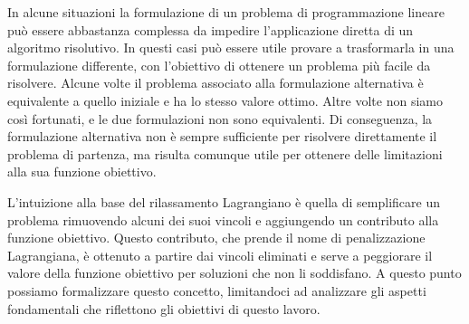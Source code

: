 In alcune situazioni la formulazione di un problema di programmazione lineare può essere abbastanza complessa da
impedire l'applicazione diretta di un algoritmo risolutivo. In questi casi può essere utile provare a trasformarla in
una formulazione differente, con l'obiettivo di ottenere un problema più facile da risolvere. Alcune volte il problema
associato alla formulazione alternativa è equivalente a quello iniziale e ha lo stesso valore ottimo. Altre volte non siamo
così fortunati, e le due formulazioni non sono equivalenti. Di conseguenza, la formulazione alternativa non è sempre
sufficiente per risolvere direttamente il problema di partenza, ma risulta comunque utile per ottenere delle limitazioni
alla sua funzione obiettivo.

L'intuizione alla base del rilassamento Lagrangiano è quella di semplificare un problema rimuovendo alcuni dei suoi
vincoli e aggiungendo un contributo alla funzione obiettivo. Questo contributo, che prende il nome di penalizzazione
Lagrangiana, è ottenuto a partire dai vincoli eliminati e serve a peggiorare il valore della funzione obiettivo per
soluzioni che non li soddisfano.
A questo punto possiamo formalizzare questo concetto, limitandoci ad analizzare gli aspetti fondamentali che riflettono
gli obiettivi di questo lavoro.

